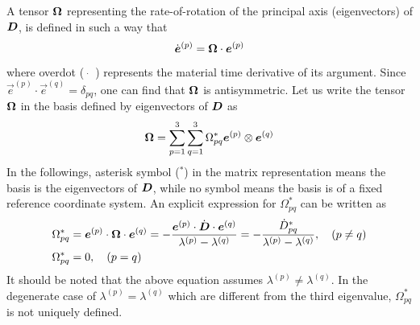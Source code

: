 A tensor $\boldsymbol{\Omega}$ representing the rate-of-rotation of 
the principal axis (eigenvectors) of $\boldsymbol{D}$,
is defined in such a way that
\begin{equation}
\dot{\boldsymbol{e}}^{(p)}
=
\boldsymbol{\Omega}
\cdot
\boldsymbol{e}^{(p)}
\end{equation}
where overdot ($\dot{\quad}$) represents the material time derivative of its argument.
%
Since $\vec{e}^{(p)} \cdot \vec{e}^{(q)} = \delta_{pq}$, 
one can find that $\boldsymbol{\Omega}$ is antisymmetric.
%
Let us write the tensor $\boldsymbol{\Omega}$ in the basis defined by eigenvectors of $\boldsymbol{D}$ as
\begin{equation}
\boldsymbol{\Omega} =
\sum_{p=1}^3 \sum_{q=1}^3
{\Omega}_{pq}^{*}
\boldsymbol{e}^{(p)} \otimes \boldsymbol{e}^{(q)}
\end{equation}
In the followings, asterisk symbol ($^*$) in the matrix representation means
the basis is the eigenvectors of $\boldsymbol{D}$,
while no symbol means the basis is of a fixed reference coordinate system.
%
An explicit expression for ${\Omega}_{pq}^{*}$ can be
written as
\begin{equation}
\begin{split}
{\Omega}_{pq}^{*}
&=
\boldsymbol{e}^{(p)}
\cdot
\boldsymbol{\Omega}
\cdot
\boldsymbol{e}^{(q)}
=
-
\frac
{\boldsymbol{e}^{(p)} \cdot \dot{\boldsymbol{D}} \cdot \boldsymbol{e}^{(q)}}
{\lambda^{(p)} - \lambda^{(q)}}
=
-
\frac
{\dot{D}_{pq}^{*}} 
{\lambda^{(p)} - \lambda^{(q)}}
, \quad 
(p \ne q)
\\
{\Omega}_{pq}^{*}
&= 0, \quad
(p = q)
\end{split}
\end{equation}
It should be noted that the above equation assumes 
$\lambda^{(p)} \ne \lambda^{(q)}$.
%
In the degenerate case of 
$\lambda^{(p)} = \lambda^{(q)}$ which are different from the third eigenvalue,
${\Omega}_{pq}^{*}$ is not uniquely defined.

